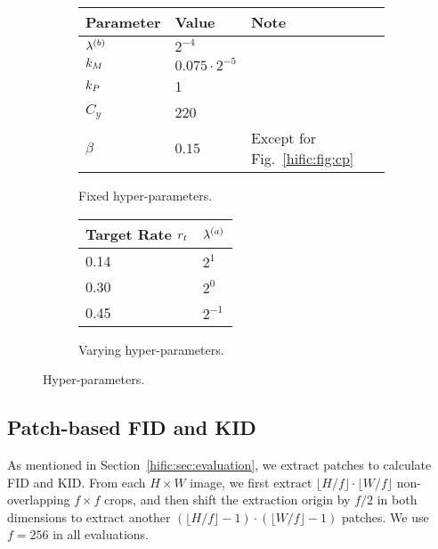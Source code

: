 \begin{subappendices}
\begin{figure}[h]
\centering
\small
\begin{subfigure}[b]{0.6\textwidth}
\centering
\begin{tabular}{lll}
\toprule
    Parameter & Value & Note \\
\midrule
    $\lambda^{(b)}$   & $2^{-4}$ \\
    $k_M$  & $0.075 \cdot 2^{-5}$ \\
    $k_P$    & 1 \\
    $C_y$    & 220 \\
    $\beta$  & $0.15$ & Except for Fig.~\ref{hific:fig:cp} \\
\bottomrule
\end{tabular}
\caption{\label{hific:fig:hyper:fixed} Fixed hyper-parameters.}
\end{subfigure}
%
\begin{subfigure}[b]{0.39\textwidth}
\centering
\begin{tabular}{ll}
\toprule
     Target Rate $r_t$ & $\lambda^{(a)}$  \\
\midrule
     0.14 & $2^1$ \\
     0.30 & $2^0$ \\
     0.45 & $2^{-1}$ \\
\bottomrule
\end{tabular}%
\caption{\label{hific:fig:hyper:var}Varying hyper-parameters.}
\end{subfigure}
\caption{Hyper-parameters.}
\end{figure}
\subsection{Patch-based FID and KID} \label{hific:sec:supp:fidpatches}
As mentioned in Section~\ref{hific:sec:evaluation}, we extract patches to calculate FID and KID. From each $H{\times}W$ image, we first extract $\lfloor H/f \rfloor \cdot \lfloor W/f \rfloor$ non-overlapping $f\times f$ crops, and then shift the extraction origin by $f{/}2$ in both dimensions to extract another 
$(\lfloor H/f \rfloor - 1)\cdot (\lfloor W/f \rfloor - 1)$ patches. We use $f=256$ in all evaluations.
                   


\end{subappendices}
